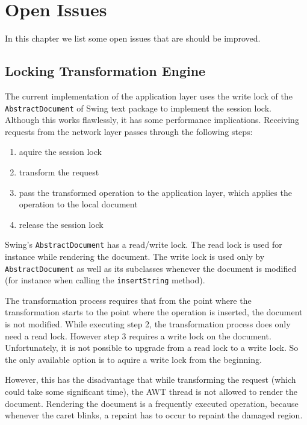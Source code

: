 \chapter{Open Issues}
\label{chapter:openissues}

In this chapter we list some open issues that are should be improved.



\section{Locking Transformation Engine}
The current implementation of the application layer uses the write lock
of the \texttt{Abstract\-Document} of Swing text package to implement
the session lock. Although this works flawlessly, it has some performance
implications. Receiving requests from the network layer passes through
the following steps:

\begin{enumerate}
 \item aquire the session lock
 \item transform the request
 \item pass the transformed operation to the application layer, which applies
       the operation to the local document
 \item release the session lock
\end{enumerate}

Swing's \texttt{Abstract\-Document} has a read/write lock. The read lock
is used for instance while rendering the document. The write lock is used
only by \texttt{Abstract\-Document} as well as its subclasses whenever the
document is modified (for instance when calling the \texttt{insert\-String}
method).

The transformation process requires that from the point where the transformation
starts to the point where the operation is inserted, the document is not 
modified. While executing step 2, the transformation process does only
need a read lock. However step 3 requires a write lock on the document.
Unfortunately, it is not possible to upgrade from a read lock to a write
lock. So the only available option is to aquire a write lock from the
beginning.

However, this has the disadvantage that while transforming
the request (which could take some significant time), the AWT thread is
not allowed to render the document. Rendering the document is a 
frequently executed operation, because whenever the caret blinks, a
repaint has to occur to repaint the damaged region.

